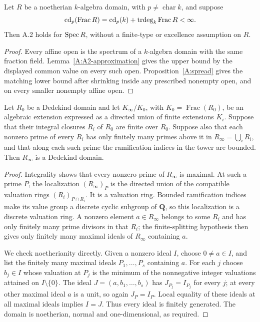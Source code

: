 \begin{corollary}
\label{A:A2-approximation-equality}
Let $R$ be a noetherian $k$-algebra domain, with $p\ne\operatorname{char}k$,
and suppose
\[
 \operatorname{cd}_p(\operatorname{Frac} R)=\operatorname{cd}_p(k)+\operatorname{trdeg}_k\operatorname{Frac} R<\infty.
\]
Then A.2 holds for $\operatorname{Spec} R$, without a finite-type or excellence
assumption on $R$.
\end{corollary}
\begin{proof}
Every affine open is the spectrum of a $k$-algebra domain with the
same fraction field. Lemma~\ref{A:A2-approximation} gives the upper
bound by the displayed common value on every such open.
Proposition~\ref{A:spread} gives the matching lower bound after
shrinking inside any prescribed nonempty open, and on every smaller
nonempty affine open.
\end{proof}

\begin{lemma}
\label{A:A2-tower-Dedekind}
Let $R_0$ be a Dedekind domain and let $K_\infty/K_0$, with
$K_0=\operatorname{Frac}(R_0)$, be an algebraic extension expressed as
a directed union of finite extensions $K_i$.  Suppose that their
integral closures $R_i$ of $R_0$ are finite over $R_0$.  Suppose also
that each nonzero prime of every $R_i$ has only finitely many primes
above it in $R_\infty=\bigcup_iR_i$, and that along each such prime
the ramification indices in the tower are bounded.  Then
$R_\infty$ is a Dedekind domain.
\end{lemma}

\begin{proof}
Integrality shows that every nonzero prime of $R_\infty$ is maximal.
At such a prime $P$, the localization $(R_\infty)_P$ is the directed
union of the compatible valuation rings $(R_i)_{P\cap R_i}$.  It is
a valuation ring.  Bounded ramification indices make its value group
a discrete cyclic subgroup of $\mathbf Q$, so this localization is
a discrete valuation ring.  A nonzero element $a\in R_\infty$
belongs to some $R_i$ and has only finitely many prime divisors in
that $R_i$; the finite-splitting hypothesis then gives only finitely
many maximal ideals of $R_\infty$ containing $a$.

We check noetherianity directly.  Given a nonzero ideal $I$, choose
$0\ne a\in I$, and list the finitely many maximal ideals
$P_1,\dots,P_s$ containing $a$.  For each $j$ choose $b_j\in I$
whose valuation at $P_j$ is the minimum of the nonnegative integer
valuations attained on $I\setminus\{0\}$.  The ideal
$J=(a,b_1,\dots,b_s)$ has $J_{P_j}=I_{P_j}$ for every $j$; at every
other maximal ideal $a$ is a unit, so again $J_P=I_P$.  Local equality
of these ideals at all maximal ideals implies $I=J$.  Thus every
ideal is finitely generated.  The domain is noetherian, normal and
one-dimensional, as required.
\end{proof}
